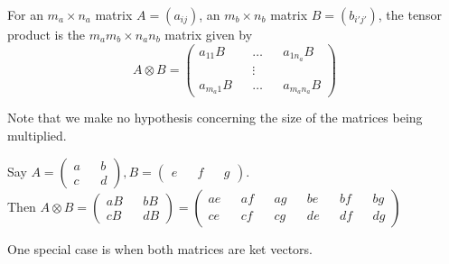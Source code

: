 \begin{definition} 
For an $m_a \times n_a$ matrix $A=(a_{ij})$, an $m_b \times n_b$ matrix $B=(b_{i'j'})$, the tensor product is the $m_a m_b \times n_a n_b$ matrix given by
\begin{equation}
A \otimes B=\begin{pmatrix}
a_{11}B && \hdots && a_{1n_a}B\\
&& \vdots && \\ 
a_{m_a1}B && \hdots && a_{m_a n_a}B
\end{pmatrix}    
\end{equation}
\end{definition}
Note that we make no hypothesis concerning the size of the matrices being multiplied.

\begin{example}
Say $A=\begin{pmatrix}
a && b\\
c && d
\end{pmatrix},
B=\begin{pmatrix}
e && f && g
\end{pmatrix}$.\\
Then $A \otimes B
=\begin{pmatrix}
aB && bB\\
cB && dB
\end{pmatrix}
=\begin{pmatrix} 
ae && af && ag && be && bf && bg\\
ce && cf && cg && de && df && dg
\end{pmatrix}$
\end{example}

\medskip

One special case is when both matrices are ket vectors. 

